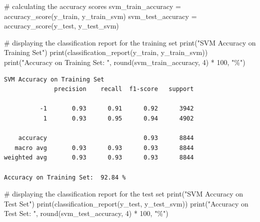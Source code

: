 \documentclass[
  letterpaper,
  DIV=11,
  numbers=noendperiod]{scrartcl}
\newenvironment{Shaded}{\begin{snugshade}}{\end{snugshade}}
\newcommand{\BuiltInTok}[1]{\textcolor[rgb]{0.00,0.23,0.31}{#1}}
\newcommand{\CommentTok}[1]{\textcolor[rgb]{0.37,0.37,0.37}{#1}}
\newcommand{\DecValTok}[1]{\textcolor[rgb]{0.68,0.00,0.00}{#1}}
\newcommand{\NormalTok}[1]{\textcolor[rgb]{0.00,0.23,0.31}{#1}}
\newcommand{\OperatorTok}[1]{\textcolor[rgb]{0.37,0.37,0.37}{#1}}
\newcommand{\StringTok}[1]{\textcolor[rgb]{0.13,0.47,0.30}{#1}}
\begin{document}
\begin{Shaded}
\begin{Highlighting}[]
\CommentTok{\# calculating the accuracy scores}
\NormalTok{svm\_train\_accuracy }\OperatorTok{=}\NormalTok{ accuracy\_score(y\_train, y\_train\_svm)}
\NormalTok{svm\_test\_accuracy }\OperatorTok{=}\NormalTok{ accuracy\_score(y\_test, y\_test\_svm)}
\end{Highlighting}
\end{Shaded}

\begin{Shaded}
\begin{Highlighting}[]
\CommentTok{\# displaying the classification report for the training set}
\BuiltInTok{print}\NormalTok{(}\StringTok{"SVM Accuracy on Training Set"}\NormalTok{)}
\BuiltInTok{print}\NormalTok{(classification\_report(y\_train, y\_train\_svm))}
\BuiltInTok{print}\NormalTok{(}\StringTok{"Accuracy on Training Set: "}\NormalTok{, }\BuiltInTok{round}\NormalTok{(svm\_train\_accuracy, }\DecValTok{4}\NormalTok{) }\OperatorTok{*} \DecValTok{100}\NormalTok{, }\StringTok{"\%"}\NormalTok{)}
\end{Highlighting}
\end{Shaded}

\begin{verbatim}
SVM Accuracy on Training Set
              precision    recall  f1-score   support

          -1       0.93      0.91      0.92      3942
           1       0.93      0.95      0.94      4902

    accuracy                           0.93      8844
   macro avg       0.93      0.93      0.93      8844
weighted avg       0.93      0.93      0.93      8844

Accuracy on Training Set:  92.84 %
\end{verbatim}

\begin{Shaded}
\begin{Highlighting}[]
\CommentTok{\# displaying the classification report for the test set}
\BuiltInTok{print}\NormalTok{(}\StringTok{"SVM Accuracy on Test Set"}\NormalTok{)}
\BuiltInTok{print}\NormalTok{(classification\_report(y\_test, y\_test\_svm))}
\BuiltInTok{print}\NormalTok{(}\StringTok{"Accuracy on Test Set: "}\NormalTok{, }\BuiltInTok{round}\NormalTok{(svm\_test\_accuracy, }\DecValTok{4}\NormalTok{) }\OperatorTok{*} \DecValTok{100}\NormalTok{, }\StringTok{"\%"}\NormalTok{)}
\end{Highlighting}
\end{Shaded}
\end{document}
